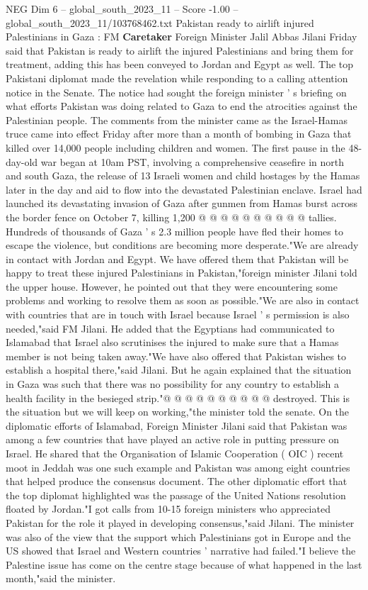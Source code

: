 \begin{textsample}{NEG Dim 6 – global\_south\_2023\_11 – Score -1.00 – global\_south\_2023\_11/103768462.txt}  \label{ex:f6_neg_147}
Pakistan ready to airlift injured Palestinians in Gaza : FM \textbf{Caretaker} Foreign Minister Jalil Abbas Jilani Friday said that Pakistan is ready to airlift the injured Palestinians and bring them for treatment, adding this has been conveyed to Jordan and Egypt as well.
The top Pakistani diplomat made the revelation while responding to a calling attention notice in the Senate.
The notice had sought the foreign minister ' s briefing on what efforts Pakistan was doing related to Gaza to end the atrocities against the Palestinian people.
The comments from the minister came as the Israel-Hamas truce came into effect Friday after more than a month of bombing in Gaza that killed over 14,000 people including children and women.
The first pause in the 48-day-old war began at 10am PST, involving a comprehensive ceasefire in north and south Gaza, the release of 13 Israeli women and child hostages by the Hamas later in the day and aid to flow into the devastated Palestinian enclave.
Israel had launched its devastating invasion of Gaza after gunmen from Hamas burst across the border fence on October 7, killing 1,200 @ @ @ @ @ @ @ @ @ @ tallies.
Hundreds of thousands of Gaza ' s 2.3 million people have fled their homes to escape the violence, but conditions are becoming more desperate."We are already in contact with Jordan and Egypt.
We have offered them that Pakistan will be happy to treat these injured Palestinians in Pakistan,"foreign minister Jilani told the upper house.
However, he pointed out that they were encountering some problems and working to resolve them as soon as possible."We are also in contact with countries that are in touch with Israel because Israel ' s permission is also needed,"said FM Jilani.
He added that the Egyptians had communicated to Islamabad that Israel also scrutinises the injured to make sure that a Hamas member is not being taken away."We have also offered that Pakistan wishes to establish a hospital there,"said Jilani.
But he again explained that the situation in Gaza was such that there was no possibility for any country to establish a health facility in the besieged strip."@ @ @ @ @ @ @ @ @ @ destroyed.
This is the situation but we will keep on working,"the minister told the senate.
On the diplomatic efforts of Islamabad, Foreign Minister Jilani said that Pakistan was among a few countries that have played an active role in putting pressure on Israel.
He shared that the Organisation of Islamic Cooperation ( OIC ) recent moot in Jeddah was one such example and Pakistan was among eight countries that helped produce the consensus document.
The other diplomatic effort that the top diplomat highlighted was the passage of the United Nations resolution floated by Jordan."I got calls from 10-15 foreign ministers who appreciated Pakistan for the role it played in developing consensus,"said Jilani.
The minister was also of the view that the support which Palestinians got in Europe and the US showed that Israel and Western countries ' narrative had failed."I believe the Palestine issue has come on the centre stage because of what happened in the last month,"said the minister.

\end{textsample}
